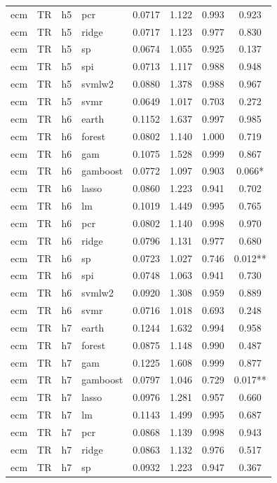 \begin{ThreePartTable}
\begin{longtable}[t]{llclcccc}
ecm & TR & h5 & pcr & 0.0717 & 1.122 & 0.993 & 0.923\\
ecm & TR & h5 & ridge & 0.0717 & 1.123 & 0.977 & 0.830\\
ecm & TR & h5 & sp & 0.0674 & 1.055 & 0.925 & 0.137\\
ecm & TR & h5 & spi & 0.0713 & 1.117 & 0.988 & 0.948\\
ecm & TR & h5 & svmlw2 & 0.0880 & 1.378 & 0.988 & 0.967\\
ecm & TR & h5 & svmr & 0.0649 & 1.017 & 0.703 & 0.272\\
\addlinespace
ecm & TR & h6 & earth & 0.1152 & 1.637 & 0.997 & 0.985\\
ecm & TR & h6 & forest & 0.0802 & 1.140 & 1.000 & 0.719\\
ecm & TR & h6 & gam & 0.1075 & 1.528 & 0.999 & 0.867\\
ecm & TR & h6 & gamboost & 0.0772 & 1.097 & 0.903 & 0.066*\\
ecm & TR & h6 & lasso & 0.0860 & 1.223 & 0.941 & 0.702\\
ecm & TR & h6 & lm & 0.1019 & 1.449 & 0.995 & 0.765\\
ecm & TR & h6 & pcr & 0.0802 & 1.140 & 0.998 & 0.970\\
ecm & TR & h6 & ridge & 0.0796 & 1.131 & 0.977 & 0.680\\
ecm & TR & h6 & sp & 0.0723 & 1.027 & 0.746 & 0.012**\\
ecm & TR & h6 & spi & 0.0748 & 1.063 & 0.941 & 0.730\\
ecm & TR & h6 & svmlw2 & 0.0920 & 1.308 & 0.959 & 0.889\\
ecm & TR & h6 & svmr & 0.0716 & 1.018 & 0.693 & 0.248\\
\addlinespace
ecm & TR & h7 & earth & 0.1244 & 1.632 & 0.994 & 0.958\\
ecm & TR & h7 & forest & 0.0875 & 1.148 & 0.990 & 0.487\\
ecm & TR & h7 & gam & 0.1225 & 1.608 & 0.999 & 0.877\\
ecm & TR & h7 & gamboost & 0.0797 & 1.046 & 0.729 & 0.017**\\
ecm & TR & h7 & lasso & 0.0976 & 1.281 & 0.957 & 0.660\\
ecm & TR & h7 & lm & 0.1143 & 1.499 & 0.995 & 0.687\\
ecm & TR & h7 & pcr & 0.0868 & 1.139 & 0.998 & 0.943\\
ecm & TR & h7 & ridge & 0.0863 & 1.132 & 0.976 & 0.517\\
ecm & TR & h7 & sp & 0.0932 & 1.223 & 0.947 & 0.367\\

\end{longtable}
\end{ThreePartTable}
